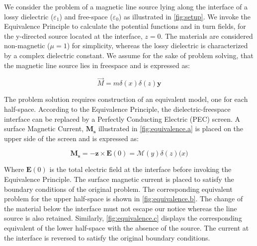 \documentclass{article}
\begin{document}
  We consider the problem of a magnetic line source lying along the interface of a lossy dielectric ($\varepsilon_1$) and free-space ($\varepsilon_0$) as illustrated in \ref{fig:setup}. We invoke the Equivalence Principle to calculate the potential functions and in turn fields, for the y-directed source located at the interface, $z = 0$. The materials are considered non-magnetic ($\mu = 1$) for simplicity, whereas the lossy dielectric is characterized by a complex dielectric constant. We assume for the sake of problem solving, that the magnetic line source lies in freespace and is expressed as:

  \begin{equation}
    \overrightarrow{M} = m \delta(x) \delta(z) \mathbf{y}
    \label{Current}
  \end{equation}

  The problem solution requires construction of an equivalent model, one for each half-space. According to the Equivalence Principle, the dielectric-freespace interface can be replaced by a Perfectly Conducting Electric (PEC) screen. A surface Magnetic Current, $\mathbf{M_s}$ illustrated in \ref{fig:equivalence.a} is placed on the upper side of the screen and is expressed as:

  \begin{equation}
    \mathbf{M_s} = - \mathbf{z} \times \mathbf{E}(0) = \mathcal{M}(y) \delta (z) \mathbf(x)
    \end{equation}

    Where $\mathbf{E}(0)$ is the total electric field at the interface before invoking the Equivalence Principle. The surface magnetic current is placed to satisfy the boundary conditions of the original problem. The corresponding equivalent problem for the upper half-space is shown in \ref{fig:equivalence.b}. The change of the material below the interface must not escape our notice whereas the line source is also retained. Similarly,
    \ref{fig:equivalence.c} displays the corresponding equivalent of the lower half-space with the absence of the source. The current at the interface is reversed to satisfy the original boundary conditions.
  
\end{document}
